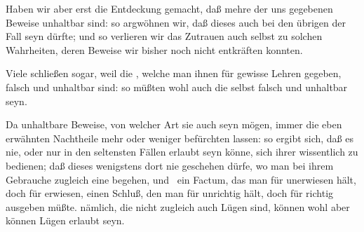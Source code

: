 \begin{aufza}
\begin{aufzb}
\item Haben wir aber erst die Entdeckung gemacht, daß mehre der uns gegebenen Beweise unhaltbar sind: so argwöhnen wir, daß dieses auch bei den übrigen der Fall seyn dürfte; und so verlieren wir das Zutrauen auch selbst zu solchen Wahrheiten, deren Beweise wir bisher noch nicht entkräften konnten.
\item Viele schließen sogar, weil die , welche man ihnen für gewisse Lehren gegeben, falsch und unhaltbar sind: so müßten wohl auch die  selbst falsch und unhaltbar seyn.
\end{aufzb}
\item Da unhaltbare Beweise, von welcher Art sie auch seyn mögen, immer die eben erwähnten Nachtheile mehr oder weniger befürchten lassen: so ergibt sich, daß es nie, oder nur in den seltensten Fällen erlaubt seyn könne, sich ihrer wissentlich zu bedienen; daß dieses wenigstens dort nie geschehen dürfe, wo man bei ihrem Gebrauche zugleich eine  begehen, und \zB\ ein Factum, das man für unerwiesen hält, doch für erwiesen, einen Schluß, den man für unrichtig hält, doch für richtig ausgeben müßte.  nämlich, die nicht zugleich auch Lügen sind, können wohl  aber können Lügen erlaubt seyn.
\end{aufza}

